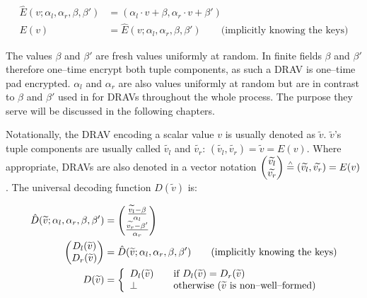 \begin{align}
  \label{eqn:one-time-pad}
  \hat{E}(v; \alpha_l, \alpha_r, \beta, \beta') &=
  (\alpha_l \cdot v + \beta, \alpha_r \cdot v + \beta')\\
  E(v) &= \hat{E}(v; \alpha_l, \alpha_r, \beta, \beta') \qquad
  \text{(implicitly knowing the keys)}\nonumber
\end{align}

\noindent{}The values $\beta$ and $\beta'$ are fresh values uniformly at random.
In finite fields $\beta$ and $\beta'$ therefore one--time encrypt both tuple
components, as such a DRAV is one--time pad encrypted.  $\alpha_l$ and
$\alpha_r$ are also values uniformly at random but are in contrast to $\beta$
and $\beta'$ used in for DRAVs throughout the whole process. The purpose they
serve will be discussed in the following chapters.

Notationally, the DRAV encoding a scalar value $v$ is usually denoted as
$\widetilde{v}$. $\widetilde{v}$'s tuple components are usually called
$\widetilde{v_l}$ and $\widetilde{v_r}$: $(\widetilde{v_l}, \widetilde{v_r}) =
\widetilde{v} = E(v)$. Where appropriate, DRAVs are also denoted in a vector
notation $\begin{pmatrix}\widetilde{v_l}\\\widetilde{v_r}\end{pmatrix}
\stackrel{\scriptscriptstyle\wedge}{=} (\widetilde{v_l}, \widetilde{v_r}) = E(v)$. The universal decoding
function $D(\widetilde{v})$ is:

\begin{align}
  \hat{D}(\widetilde{v}; \alpha_l, \alpha_r, \beta, \beta') &=
  \begin{pmatrix}
    \frac{\widetilde{v_l} - \beta}{\alpha_l}\\
    \frac{\widetilde{v_r} - \beta'}{\alpha_r}
  \end{pmatrix} \nonumber\\
  \label{eqn:keys-assumed}
\begin{pmatrix}D_l(\widetilde{v})\\D_r(\widetilde{v})\end{pmatrix} &=
  \hat{D}(\widetilde{v}; \alpha_l, \alpha_r, \beta, \beta') \qquad
  \text{(implicitly knowing the keys)}\\
  D(\widetilde{v}) &=
  \left\{
    \begin{array}{l l}
      D_l(\widetilde{v}) & \quad
      \text{if}~D_l(\widetilde{v}) = D_r(\widetilde{v})\\
      \bot & \quad \text{otherwise ($\widetilde{v}$ is non--well--formed)}\\
    \end{array}\right.\nonumber
\end{align}

